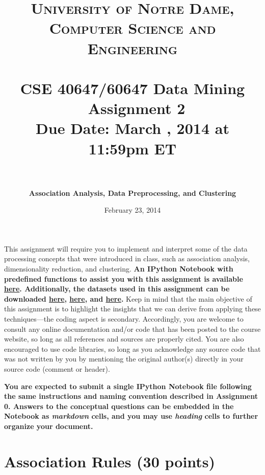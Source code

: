 \documentclass[paper=a4, fontsize=11pt]{scrartcl} %
\title{	
\normalfont \normalsize
\textsc{University of Notre Dame, Computer Science and Engineering} \\ [25pt] %
\horrule{0.5pt} \\[0.4cm] %
\huge CSE 40647/60647  Data Mining \textemdash~Assignment 2\\Due Date: March \nth{3}, 2014 at 11:59pm ET\\ %
\horrule{2pt} \\[0.5cm] %
}
\author{\textbf{Association Analysis, Data Preprocessing, and Clustering }} %
\date{\normalsize{February 23, 2014}} %
\numberwithin{equation}{section} %
\numberwithin{figure}{section} %
\numberwithin{table}{section} %
\begin{document}
\maketitle %


This assignment will require you to implement and interpret some of the data processing concepts that were introduced in class, such as association analysis, dimensionality reduction, and clustering.  \textbf{An IPython Notebook with predefined functions to assist you with this assignment is available \href{http://nbviewer.ipython.org/github/cse40647/cse40647/blob/sp.14/assignment2/assignment2.ipynb}{here}. Additionally, the datasets used in this assignment can be downloaded \href{https://github.com/cse40647/cse40647/blob/sp.14/assignment2/bakery.zip}{here}, \href{https://github.com/cse40647/cse40647/blob/sp.14/assignment2/campus.zip}{here}, and \href{https://github.com/cse40647/cse40647/blob/sp.14/assignment2/cute_kittens.zip}{here}.} Keep in mind that the main objective of this assignment is to highlight the insights that we can derive from applying these techniques---the coding aspect is secondary. Accordingly, you are welcome to consult any online documentation and/or code that has been posted to the course website, so long as all references and sources are properly cited. You are also encouraged to use code libraries, so long as you acknowledge any source code that was not written by you by mentioning the original author(s) directly in your source code (comment or header).

\vspace{10pt}

\textbf{You are expected to submit a single IPython Notebook file following the same instructions and naming convention described in Assignment 0. Answers to the conceptual questions can be embedded in the Notebook as \textit{markdown} cells, and you may use \textit{heading} cells to further organize your document.}

\newpage

\section{Association Rules (30 points)}
\end{document}
